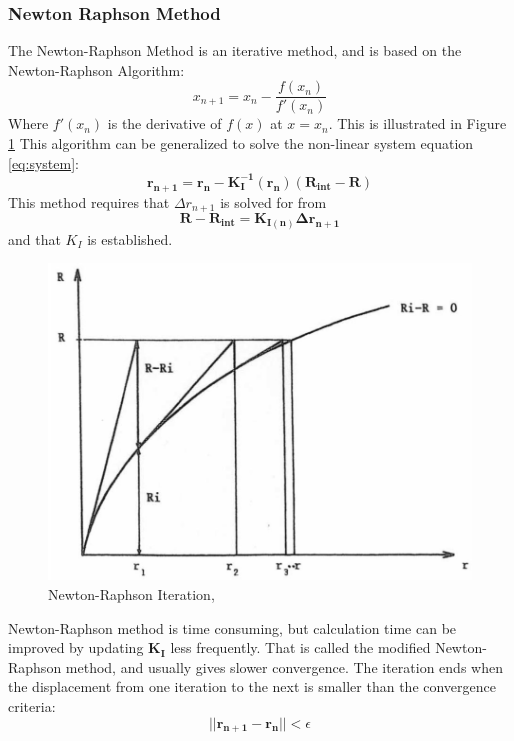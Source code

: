 \subsubsection{Newton Raphson Method}
\label{sec:newton}
The Newton-Raphson Method is an iterative method, and is based on the Newton-Raphson Algorithm:
\begin{equation}
    x_{n+1}=x_n - \frac{f(x_n)}{f'(x_n)}
\end{equation}
 Where $f'(x_n)$ is the derivative of $f(x)$ at $x=x_n$. This is illustrated in Figure \ref{fig:newton}
 \noindent This algorithm can be generalized to solve the non-linear system equation \ref{eq:system}:
 \begin{equation}
  \boldsymbol{r_{n+1}}= \boldsymbol{r_n-K_I^{-1}(r_n)(R_{int}-R)} 
\end{equation}
This method requires that $\Delta r_{n+1}$ is solved for from 
\begin{equation}
   \boldsymbol{R-R_{int}}=\boldsymbol{K_{I(n)}\Delta r_{n+1}}
   \label{eq:newton}
\end{equation}
and that $K_I$ is established. 
 \begin{figure}[H]
\centering
\includegraphics[scale=0.5]{figures/newton2}
\caption[$\; \:$Newton-Raphson Iteration]{Newton-Raphson Iteration, \cite{moan2003} }
 \label{fig:newton}
\end{figure}
\noindent Newton-Raphson method is time consuming, but calculation time can be improved by updating $\boldsymbol{K_I}$ less frequently. That is called the modified Newton-Raphson method, and usually gives slower convergence.  The iteration ends when the displacement from one iteration to the next is smaller than the convergence criteria:
\begin{equation}
    ||\boldsymbol{r_{n+1}-r_n||} < \epsilon
\end{equation}

